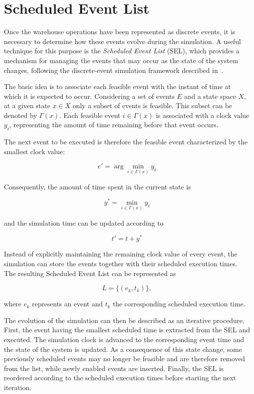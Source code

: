 \section{Scheduled Event List}
\label{sec:theory-sel}

Once the warehouse operations have been represented as discrete events, it is
necessary to determine how these events evolve during the simulation. A useful
technique for this purpose is the \textit{Scheduled Event List} (SEL), which
provides a mechanism for managing the events that may occur as the state of the
system changes, following the discrete-event simulation framework described
in~\cite{cassandras2021des}.

The basic idea is to associate each feasible event with the instant of time at
which it is expected to occur. Considering a set of events $E$ and a state space
$X$, at a given state $x \in X$ only a subset of events is feasible. This subset
can be denoted by $\Gamma(x)$. Each feasible event $i \in \Gamma(x)$ is associated
with a clock value $y_i$, representing the amount of time remaining before that
event occurs.

The next event to be executed is therefore the feasible event characterized by
the smallest clock value:

\begin{equation}
	e' = \arg\min_{i \in \Gamma(x)} y_i
\end{equation}


\noindent Consequently, the amount of time spent in the current state is

\begin{equation}
	y^* = \min_{i \in \Gamma(x)} y_i
\end{equation}

\noindent and the simulation time can be updated according to

\begin{equation}
	t' = t + y^*
\end{equation}

\noindent Instead of explicitly maintaining the remaining clock value of every event, the
simulation can store the events together with their scheduled execution times.
The resulting Scheduled Event List can be represented as

\[
L = \{(e_k,t_k)\},
\]

\noindent where $e_k$ represents an event and $t_k$ the corresponding scheduled execution
time.

The evolution of the simulation can then be described as an iterative procedure.
First, the event having the smallest scheduled time is extracted from the SEL
and executed. The simulation clock is advanced to the corresponding event time
and the state of the system is updated. As a consequence of this state change,
some previously scheduled events may no longer be feasible and are therefore
removed from the list, while newly enabled events are inserted. Finally, the SEL
is reordered according to the scheduled execution times before starting the next
iteration.

